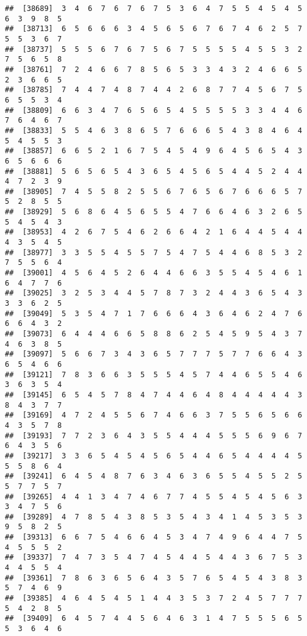 \documentclass[
]{book}
\begin{document}
\begin{verbatim}
##  [38689]  3  4  6  7  6  7  6  7  5  3  6  4  7  5  5  4  5  4  5  6  3  9  8  5
##  [38713]  6  5  6  6  6  3  4  5  6  5  6  7  6  7  4  6  2  5  7  5  5  3  6  7
##  [38737]  5  5  5  6  7  6  7  5  6  7  5  5  5  5  4  5  5  3  2  7  5  6  5  8
##  [38761]  7  2  4  6  6  7  8  5  6  5  3  3  4  3  2  4  6  6  5  2  3  6  6  5
##  [38785]  7  4  4  7  4  8  7  4  4  2  6  8  7  7  4  5  6  7  5  6  5  5  3  4
##  [38809]  6  6  3  4  7  6  5  6  5  4  5  5  5  5  3  3  4  4  6  7  6  4  6  7
##  [38833]  5  5  4  6  3  8  6  5  7  6  6  6  5  4  3  8  4  6  4  5  4  5  5  3
##  [38857]  6  6  5  2  1  6  7  5  4  5  4  9  6  4  5  6  5  4  3  6  5  6  6  6
##  [38881]  5  6  5  6  5  4  3  6  5  4  5  6  5  4  4  5  2  4  4  4  7  2  3  9
##  [38905]  7  4  5  5  8  2  5  5  6  7  6  5  6  7  6  6  6  5  7  5  2  8  5  5
##  [38929]  5  6  8  6  4  5  6  5  5  4  7  6  6  4  6  3  2  6  5  5  4  5  4  3
##  [38953]  4  2  6  7  5  4  6  2  6  6  4  2  1  6  4  4  5  4  4  4  3  5  4  5
##  [38977]  3  3  5  5  4  5  5  7  5  4  7  5  4  4  6  8  5  3  2  7  5  5  6  4
##  [39001]  4  5  6  4  5  2  6  4  4  6  6  3  5  5  4  5  4  6  1  6  4  7  7  6
##  [39025]  3  2  5  3  4  4  5  7  8  7  3  2  4  4  3  6  5  4  3  3  3  6  2  5
##  [39049]  5  3  5  4  7  1  7  6  6  6  4  3  6  4  6  2  4  7  6  6  6  4  3  2
##  [39073]  6  4  4  4  6  6  5  8  8  6  2  5  4  5  9  5  4  3  7  4  6  3  8  5
##  [39097]  5  6  6  7  3  4  3  6  5  7  7  7  5  7  7  6  6  4  3  6  5  4  6  6
##  [39121]  7  8  3  6  6  3  5  5  5  4  5  7  4  4  6  5  5  4  6  3  6  3  5  4
##  [39145]  6  5  4  5  7  8  4  7  4  4  6  4  8  4  4  4  4  4  3  8  4  3  7  7
##  [39169]  4  7  2  4  5  5  6  7  4  6  6  3  7  5  5  6  5  6  6  4  3  5  7  8
##  [39193]  7  7  2  3  6  4  3  5  5  4  4  4  5  5  5  6  9  6  7  6  4  3  5  6
##  [39217]  3  3  6  5  4  5  4  5  6  5  4  4  6  5  4  4  4  4  5  5  5  8  6  4
##  [39241]  6  4  5  4  8  7  6  3  4  6  3  6  5  5  4  5  5  2  5  5  7  7  5  7
##  [39265]  4  4  1  3  4  7  4  6  7  7  4  5  5  4  5  4  5  6  3  3  4  7  5  6
##  [39289]  4  7  8  5  4  3  8  5  3  5  4  3  4  1  4  5  3  5  3  9  5  8  2  5
##  [39313]  6  6  7  5  4  6  6  4  5  3  4  7  4  9  6  4  4  7  5  4  5  5  5  2
##  [39337]  7  4  7  3  5  4  7  4  5  4  4  5  4  4  3  6  7  5  3  4  4  5  5  4
##  [39361]  7  8  6  3  6  5  6  4  3  5  7  6  5  4  5  4  3  8  3  5  7  4  6  9
##  [39385]  4  6  4  5  4  5  1  4  4  3  5  3  7  2  4  5  7  7  7  5  4  2  8  5
##  [39409]  6  4  5  7  4  4  5  6  4  6  3  1  4  7  5  5  5  6  5  5  3  6  4  6

\end{verbatim}
\end{document}
